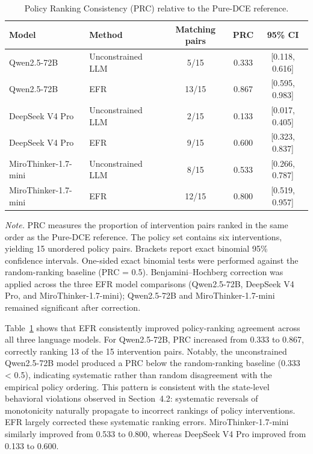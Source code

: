 \documentclass[11pt]{article}
\begin{document}
\begin{table}[t]
\centering
\caption{Policy Ranking Consistency (PRC) relative to the Pure-DCE reference.}
\label{tab:prc}
\small
\setlength{\tabcolsep}{5pt}
\begin{tabular}{l l c c c}
\toprule
Model & Method & Matching pairs & PRC & 95\% CI \\
\midrule
Qwen2.5-72B & Unconstrained LLM & 5/15 & 0.333 & [0.118, 0.616] \\
Qwen2.5-72B & EFR & 13/15 & 0.867 & [0.595, 0.983] \\
\midrule
DeepSeek V4 Pro & Unconstrained LLM & 2/15 & 0.133 & [0.017, 0.405] \\
DeepSeek V4 Pro & EFR & 9/15 & 0.600 & [0.323, 0.837] \\
\midrule
MiroThinker-1.7-mini & Unconstrained LLM & 8/15 & 0.533 & [0.266, 0.787] \\
MiroThinker-1.7-mini & EFR & 12/15 & 0.800 & [0.519, 0.957] \\
\bottomrule
\end{tabular}

\vspace{0.4em}
\begin{minipage}{0.95\textwidth}
\small
\textit{Note.} PRC measures the proportion of intervention pairs ranked in the same order as the Pure-DCE reference. The policy set contains six interventions, yielding 15 unordered policy pairs. Brackets report exact binomial 95\% confidence intervals. One-sided exact binomial tests were performed against the random-ranking baseline (PRC = 0.5). Benjamini--Hochberg correction was applied across the three EFR model comparisons (Qwen2.5-72B, DeepSeek V4 Pro, and MiroThinker-1.7-mini); Qwen2.5-72B and MiroThinker-1.7-mini remained significant after correction.
\end{minipage}
\end{table}

Table~\ref{tab:prc} shows that EFR consistently improved policy-ranking agreement across all three language models. For Qwen2.5-72B, PRC increased from 0.333 to 0.867, correctly ranking 13 of the 15 intervention pairs. Notably, the unconstrained Qwen2.5-72B model produced a PRC below the random-ranking baseline (0.333 < 0.5), indicating systematic rather than random disagreement with the empirical policy ordering. This pattern is consistent with the state-level behavioral violations observed in Section~4.2: systematic reversals of monotonicity naturally propagate to incorrect rankings of policy interventions. EFR largely corrected these systematic ranking errors. MiroThinker-1.7-mini similarly improved from 0.533 to 0.800, whereas DeepSeek V4 Pro improved from 0.133 to 0.600.
\end{document}
